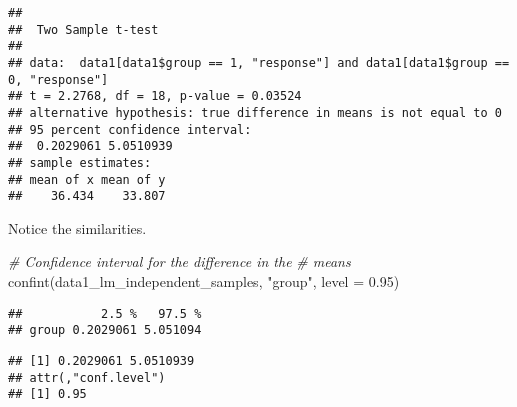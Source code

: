 \documentclass[
]{book}
\newenvironment{Shaded}{\begin{snugshade}}{\end{snugshade}}
\newcommand{\AttributeTok}[1]{\textcolor[rgb]{0.77,0.63,0.00}{#1}}
\newcommand{\CommentTok}[1]{\textcolor[rgb]{0.56,0.35,0.01}{\textit{#1}}}
\newcommand{\ConstantTok}[1]{\textcolor[rgb]{0.00,0.00,0.00}{#1}}
\newcommand{\DecValTok}[1]{\textcolor[rgb]{0.00,0.00,0.81}{#1}}
\newcommand{\FloatTok}[1]{\textcolor[rgb]{0.00,0.00,0.81}{#1}}
\newcommand{\FunctionTok}[1]{\textcolor[rgb]{0.00,0.00,0.00}{#1}}
\newcommand{\NormalTok}[1]{#1}
\newcommand{\SpecialCharTok}[1]{\textcolor[rgb]{0.00,0.00,0.00}{#1}}
\newcommand{\StringTok}[1]{\textcolor[rgb]{0.31,0.60,0.02}{#1}}
\begin{document}
\begin{Shaded}
\end{Shaded}

\begin{verbatim}
## 
##  Two Sample t-test
## 
## data:  data1[data1$group == 1, "response"] and data1[data1$group == 0, "response"]
## t = 2.2768, df = 18, p-value = 0.03524
## alternative hypothesis: true difference in means is not equal to 0
## 95 percent confidence interval:
##  0.2029061 5.0510939
## sample estimates:
## mean of x mean of y 
##    36.434    33.807
\end{verbatim}

Notice the similarities.

\begin{Shaded}
\begin{Highlighting}[]
\CommentTok{\# Confidence interval for the difference in the}
\CommentTok{\# means}
\FunctionTok{confint}\NormalTok{(data1\_lm\_independent\_samples, }\StringTok{"group"}\NormalTok{, }\AttributeTok{level =} \FloatTok{0.95}\NormalTok{)}
\end{Highlighting}
\end{Shaded}

\begin{verbatim}
##           2.5 %   97.5 %
## group 0.2029061 5.051094
\end{verbatim}

\begin{Shaded}
\end{Shaded}

\begin{verbatim}
## [1] 0.2029061 5.0510939
## attr(,"conf.level")
## [1] 0.95
\end{verbatim}
\end{document}
